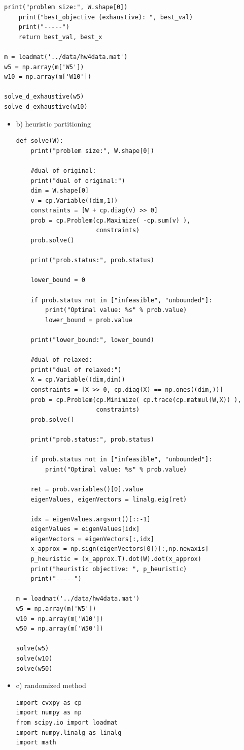 \documentclass[12pt,letter]{article}
\begin{document}
\begin{enumerate}
\begin{enumerate}
\begin{Verbatim}[fontsize=\small]
    print("problem size:", W.shape[0])
    print("best_objective (exhaustive): ", best_val)
    print("-----")
    return best_val, best_x
    
m = loadmat('../data/hw4data.mat')
w5 = np.array(m['W5'])
w10 = np.array(m['W10'])

solve_d_exhaustive(w5)
solve_d_exhaustive(w10)
\end{Verbatim}
    
\pagebreak
    \begin{itemize}
    \item b) heuristic partitioning
\begin{Verbatim}[fontsize=\small]
def solve(W):
    print("problem size:", W.shape[0])
    
    #dual of original:
    print("dual of original:")
    dim = W.shape[0]
    v = cp.Variable((dim,1))
    constraints = [W + cp.diag(v) >> 0]
    prob = cp.Problem(cp.Maximize( -cp.sum(v) ),
                      constraints)
    prob.solve()

    print("prob.status:", prob.status)
    
    lower_bound = 0
    
    if prob.status not in ["infeasible", "unbounded"]:
        print("Optimal value: %s" % prob.value)
        lower_bound = prob.value

    print("lower_bound:", lower_bound)

    #dual of relaxed:
    print("dual of relaxed:")
    X = cp.Variable((dim,dim))
    constraints = [X >> 0, cp.diag(X) == np.ones((dim,))]
    prob = cp.Problem(cp.Minimize( cp.trace(cp.matmul(W,X)) ),
                      constraints)
    prob.solve()

    print("prob.status:", prob.status)
    
    if prob.status not in ["infeasible", "unbounded"]:
        print("Optimal value: %s" % prob.value)

    ret = prob.variables()[0].value
    eigenValues, eigenVectors = linalg.eig(ret)

    idx = eigenValues.argsort()[::-1]
    eigenValues = eigenValues[idx]
    eigenVectors = eigenVectors[:,idx]
    x_approx = np.sign(eigenVectors[0])[:,np.newaxis]
    p_heuristic = (x_approx.T).dot(W).dot(x_approx)
    print("heuristic objective: ", p_heuristic)
    print("-----")
    
m = loadmat('../data/hw4data.mat')
w5 = np.array(m['W5'])
w10 = np.array(m['W10'])
w50 = np.array(m['W50'])

solve(w5)
solve(w10)
solve(w50)
\end{Verbatim}
      \pagebreak
    \item c) randomized method
\begin{Verbatim}[fontsize=\small]
import cvxpy as cp
import numpy as np
from scipy.io import loadmat
import numpy.linalg as linalg
import math


\end{Verbatim}
\end{itemize}
\end{enumerate}
\end{enumerate}
\end{document}
